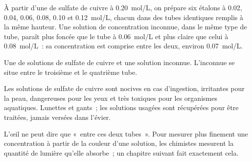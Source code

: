 \begin{example}\label{ex:g10:concentration-and-dilution:scale}
À partir d'une  de sulfate de cuivre à \qty{0.20}{mol/L},
on prépare six étalons à 0.02, 0.04, 0.06, 0.08, 0.10 et
\qty{0.12}{mol/L}, chacun dans des tubes identiques remplis à la même
hauteur. Une solution de concentration inconnue, dans le même type de
tube, paraît plus foncée que le tube à \qty{0.06}{mol/L} et plus claire
que celui à \qty{0.08}{mol/L}~: sa concentration est comprise entre les
deux, environ \qty{0.07}{mol/L}.
\end{example}

\begin{omfigure}

{\small Une  de solutions de sulfate de cuivre et une
solution inconnue. L'inconnue se situe entre le troisième et le
quatrième tube.}
\end{omfigure}

\begin{safety}{}
Les solutions de sulfate de cuivre sont nocives en cas d'ingestion,
irritantes pour la peau, dangereuses pour les yeux et très toxiques pour
les organismes aquatiques. Lunettes et gants~; les solutions usagées
sont récupérées pour être traitées, jamais versées dans l'évier.
\end{safety}

\begin{remark}\label{rem:g10:concentration-and-dilution:eye}
L'œil ne peut dire que «~entre ces deux tubes~». Pour mesurer plus
finement une concentration à partir de la couleur d'une solution, les
chimistes mesurent la quantité de lumière qu'elle absorbe~; un chapitre
suivant fait exactement cela.
\end{remark}

